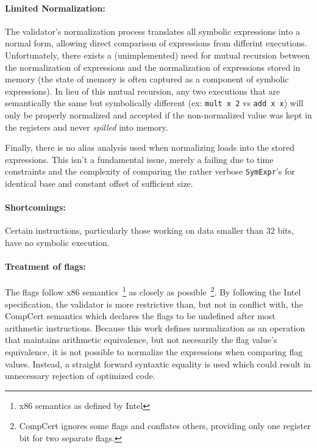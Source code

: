 \documentclass{article}
\begin{document}
\paragraph{Limited Normalization: }The validator's normalization
process translates all symbolic expressions into a normal form,
allowing direct comparison of expressions from differint executions.
Unfortunately, there exists a (unimplemented) need for mutual
recursion between the normalization of expressions and the
normalization of expressions stored in memory (the state of memory is
often captured as a component of symbolic expressions).  In lieu of
this mutual recursion, any two executions that are semantically the
same but symbolically different (ex: {\tt mult x 2} vs {\tt add x x})
will only be properly normalized and accepted if the non-normalized
value was kept in the registers and never {\it spilled} into memory.

Finally, there is no alias analysis used when normalizing loads into
the stored expressions.  This isn't a fundamental issue, merely a
failing due to time constraints and the complexity of comparing the
rather verbose {\tt SymExpr}'s for identical base and constant offset
of sufficient size.

\paragraph{Shortcomings: }
Certain instructions, particularly those working on data
smaller than 32 bits, have no symbolic execution.

\paragraph{Treatment of flags: } 
The flags follow x86 semantics~\footnote{x86 semantics as defined by
  Intel} as closely as possible~\footnote{CompCert ignores some flags
  and conflates others, providing only one register bit for two
  separate flags.}.  By following the Intel specification, the
validator is more restrictive than, but not in conflict with, the
CompCert semantics which declares the flags to be undefined after most
arithmetic instructions.  Because this work defines normalization as
an operation that maintains arithmetic equivalence, but not necesarily
the flag value's equivalence, it is not possible to normalize the
expressions when comparing flag values.  Instead, a straight forward
syntaxtic equality is used which could result in unnecessary rejection
of optimized code.
\end{document}
